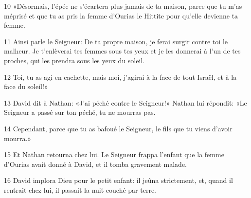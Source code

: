 
10 «Désormais, l’épée ne s’écartera plus jamais de ta maison, parce que tu m’as méprisé et que tu as pris la femme d’Ourias le Hittite pour qu’elle devienne ta femme.

11 Ainsi parle le Seigneur: De ta propre maison, je ferai surgir contre toi le malheur. Je t’enlèverai tes femmes sous tes yeux et je les donnerai à l’un de tes proches, qui les prendra sous les yeux du soleil.

12 Toi, tu as agi en cachette, mais moi, j’agirai à la face de tout Israël, et à la face du soleil!»

13 David dit à Nathan: «J’ai péché contre le Seigneur!» Nathan lui répondit: «Le Seigneur a passé sur ton péché, tu ne mourras pas.

14 Cependant, parce que tu as bafoué le Seigneur, le fils que tu viens d’avoir mourra.»

15 Et Nathan retourna chez lui. Le Seigneur frappa l’enfant que la femme d’Ourias avait donné à David, et il tomba gravement malade.

16 David implora Dieu pour le petit enfant: il jeûna strictement, et, quand il rentrait chez lui, il passait la nuit couché par terre.